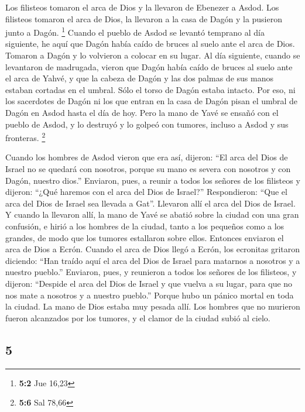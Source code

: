 \begin{paracol}{2}
 Los filisteos tomaron el arca de Dios y la llevaron de
Ebenezer a Asdod.  Los filisteos tomaron el arca de Dios,
la llevaron a la casa de Dagón y la pusieron junto a Dagón. \footnote{\textbf{5:2}
  Jue 16,23}  Cuando el pueblo de Asdod se levantó
temprano al día siguiente, he aquí que Dagón había caído de bruces al
suelo ante el arca de Dios. Tomaron a Dagón y lo volvieron a colocar en
su lugar.  Al día siguiente, cuando se levantaron de
madrugada, vieron que Dagón había caído de bruces al suelo ante el arca
de Yahvé, y que la cabeza de Dagón y las dos palmas de sus manos estaban
cortadas en el umbral. Sólo el torso de Dagón estaba intacto.
 Por eso, ni los sacerdotes de Dagón ni los que entran en
la casa de Dagón pisan el umbral de Dagón en Asdod hasta el día de hoy.
 Pero la mano de Yavé se ensañó con el pueblo de Asdod, y
lo destruyó y lo golpeó con tumores, incluso a Asdod y sus fronteras.
\footnote{\textbf{5:6} Sal 78,66}

 Cuando los hombres de Asdod vieron que era así, dijeron:
``El arca del Dios de Israel no se quedará con nosotros, porque su mano
es severa con nosotros y con Dagón, nuestro dios.'' 
Enviaron, pues, a reunir a todos los señores de los filisteos y dijeron:
``¿Qué haremos con el arca del Dios de Israel?'' Respondieron: ``Que el
arca del Dios de Israel sea llevada a Gat''. Llevaron allí el arca del
Dios de Israel.  Y cuando la llevaron allí, la mano de
Yavé se abatió sobre la ciudad con una gran confusión, e hirió a los
hombres de la ciudad, tanto a los pequeños como a los grandes, de modo
que los tumores estallaron sobre ellos.  Entonces
enviaron el arca de Dios a Ecrón. Cuando el arca de Dios llegó a Ecrón,
los ecronitas gritaron diciendo: ``Han traído aquí el arca del Dios de
Israel para matarnos a nosotros y a nuestro pueblo.'' 
Enviaron, pues, y reunieron a todos los señores de los filisteos, y
dijeron: ``Despide el arca del Dios de Israel y que vuelva a su lugar,
para que no nos mate a nosotros y a nuestro pueblo.'' Porque hubo un
pánico mortal en toda la ciudad. La mano de Dios estaba muy pesada allí.
 Los hombres que no murieron fueron alcanzados por los
tumores, y el clamor de la ciudad subió al cielo.

\switchcolumn
\begin{otherlanguage}{english}

\hypertarget{section-9}{%
\section{5}\label{section-9}}


\end{otherlanguage}
\end{paracol}
